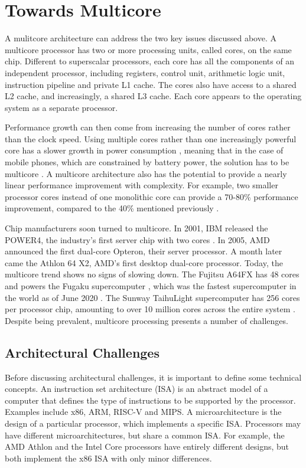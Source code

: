\documentclass[bsc,frontabs,twoside,singlespacing,parskip,deptreport]{infthesis}     %
\begin{document}
\section{Towards Multicore} \label{towards-multicore}
A mulitcore architecture can address the two key issues discussed above. A multicore processor has two or more processing units, called cores, on the same chip. Different to superscalar processors, each core has all the components of an independent processor, including registers, control unit, arithmetic logic unit, instruction pipeline and private L1 cache. The cores also have access to a shared L2 cache, and increasingly, a shared L3 cache. Each core appears to the operating system as a separate processor. 

Performance growth can then come from increasing the number of cores rather than the clock speed. Using multiple cores rather than one increasingly powerful core has a slower growth in power consumption \cite{blake_2009}, meaning that in the case of mobile phones, which are constrained by battery power, the solution has to be multicore \cite{berkel_2009}. A multicore architecture also has the potential to provide a nearly linear performance improvement with complexity. For example, two smaller processor cores instead of one monolithic core can provide a 70-80\% performance improvement, compared to the 40\% mentioned previously \cite{borkar_2007}.

Chip manufacturers soon turned to multicore. In 2001, IBM released the POWER4, the industry’s first server chip with two cores \cite{power4}. In 2005, AMD announced the first dual-core Opteron, their server processor. A month later came the Athlon 64 X2, AMD’s first desktop dual-core processor. Today, the multicore trend shows no signs of slowing down. The Fujitsu A64FX has 48 cores and powers the Fugaku supercomputer \cite{a64fx}, which was the fastest supercomputer in the world as of June 2020 \cite{top500}. The Sunway TaihuLight supercomputer has 256 cores per processor chip, amounting to over 10 million cores across the entire system \cite{sunway}. Despite being prevalent, multicore processing presents a number of challenges.

\subsection{Architectural Challenges} \label{architectural-challenges}
Before discussing architectural challenges, it is important to define some technical concepts. An instruction set architecture (ISA) is an abstract model of a computer that defines the type of instructions to be supported by the processor. Examples include x86, ARM, RISC-V and MIPS. A microarchitecture is the design of a particular processor, which implements a specific ISA. Processors may have different microarchitectures, but share a common ISA. For example, the AMD Athlon and the Intel Core processors have entirely different designs, but both implement the x86 ISA with only minor differences.
\end{document}

